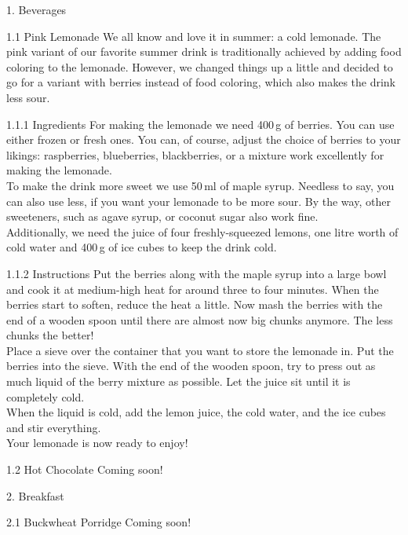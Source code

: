
	1. Beverages
	
	1.1 Pink Lemonade
	We all know and love it in summer: a cold lemonade. The pink variant of our favorite summer drink is traditionally achieved by adding food coloring to the lemonade. However, we changed things up a little and decided to go for a variant with berries instead of food coloring, which also makes the drink less sour.
	
	1.1.1 Ingredients
	For making the lemonade we need 400\,g of berries. You can use either frozen or fresh ones. You can, of course, adjust the choice of berries to your likings: raspberries, blueberries, blackberries, or a mixture work excellently for making the lemonade. \\
	To make the drink more sweet we use 50\,ml of maple syrup. Needless to say, you can also use less, if you want your lemonade to be more sour. By the way, other sweeteners, such as agave syrup, or coconut sugar also work fine. \\ 
	Additionally, we need the juice of four freshly-squeezed lemons, one litre worth of cold water and 400\,g of ice cubes to keep the drink cold.
	
	1.1.2 Instructions
	Put the berries along with the maple syrup into a large bowl and cook it at medium-high heat for around three to four minutes. When the berries start to soften, reduce the heat a little. Now mash the berries with the end of a wooden spoon until there are almost now big chunks anymore. The less chunks the better! \\
	Place a sieve over the container that you want to store the lemonade in. Put the berries into the sieve. With the end of the wooden spoon, try to press out as much liquid of the berry mixture as possible. Let the juice sit until it is completely cold. \\
	When the liquid is cold, add the lemon juice, the cold water, and the ice cubes and stir everything. \\
	Your lemonade is now ready to enjoy!
	
	1.2 Hot Chocolate
	Coming soon!
	
	2. Breakfast 
	
	2.1 Buckwheat Porridge
	Coming soon!
	